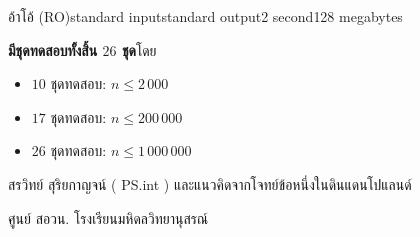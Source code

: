\documentclass[11pt,a4paper]{article}
\begin{document}
\begin{problem}{อ้าโอ้ (RO)}{standard input}{standard output}{2 second}{128 megabytes}
\Scoring

\textbf{มีชุดทดสอบทั้งสิ้น $26$ ชุด}โดย
\begin{itemize}

\item $10$ ชุดทดสอบ: $n \leq 2\,000$
\item $17$ ชุดทดสอบ: $n \leq 200\,000$
\item $26$ ชุดทดสอบ: $n \leq 1\,000\,000$
\end{itemize}
\Source

สรวิทย์  สุริยกาญจน์ ( PS.int ) และแนวคิดจากโจทย์ข้อหนึ่งในดินแดนโปแลนด์

ศูนย์ สอวน. โรงเรียนมหิดลวิทยานุสรณ์



\end{problem}
\end{document}
